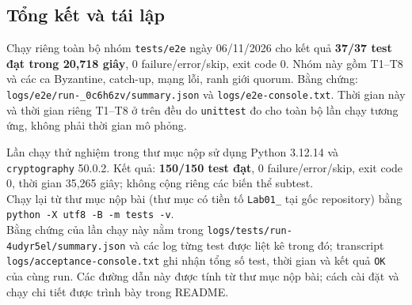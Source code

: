 \subsection{Tổng kết và tái lập}

Chạy riêng toàn bộ nhóm \texttt{tests/e2e} ngày 06/11/2026 cho kết quả \textbf{37/37 test đạt trong 20,718 giây}, 0 failure/error/skip, exit code 0. Nhóm này gồm T1--T8 và các ca Byzantine, catch-up, mạng lỗi, ranh giới quorum. Bằng chứng: \texttt{logs/e2e/run-\_0c6h6zv/summary.json} và \texttt{logs/e2e-console.txt}. Thời gian này và thời gian riêng T1--T8 ở trên đều do \texttt{unittest} đo cho toàn bộ lần chạy tương ứng, không phải thời gian mô phỏng.

Lần chạy thử nghiệm trong thư mục nộp sử dụng Python 3.12.14 và \texttt{cryptography} 50.0.2. Kết quả: \textbf{150/150 test đạt}, 0 failure/error/skip, exit code 0, thời gian 35,265 giây; không cộng riêng các biến thể subtest. \\ Chạy lại từ thư mục nộp bài (thư mục có tiền tố \texttt{Lab01\_} tại gốc repository) bằng \texttt{python -X utf8 -B -m tests -v}. \\ Bằng chứng của lần chạy này nằm trong \texttt{logs/tests/run-4udyr5el/summary.json} và các log từng test được liệt kê trong đó; transcript \texttt{logs/acceptance-console.txt} ghi nhận tổng số test, thời gian và kết quả \texttt{OK} của cùng run. Các đường dẫn này được tính từ thư mục nộp bài; cách cài đặt và chạy chi tiết được trình bày trong README.
